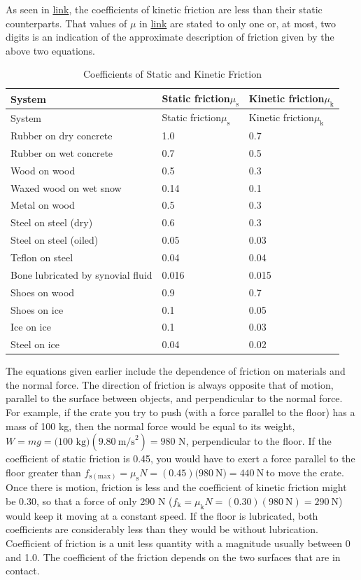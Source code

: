 \documentclass[
]{book}
\begin{document}
As seen in \protect\hyperlink{import-auto-id1165298658126}{link},
the coefficients of kinetic friction are less than their static
counterparts. That values of \(\mu{}\)\emph{} in
\protect\hyperlink{import-auto-id1165298658126}{link} are stated
to only one or, at most, two digits is an indication of the approximate
description of friction given by the above two equations.

\begin{longtable}[]{@{}lll@{}}
\caption{{Coefficients of Static and Kinetic Friction}}\tabularnewline
\toprule
System & Static friction\(\mu_{\text{s}}{}\) & Kinetic friction\(\mu_{\text{k}}{}\)\tabularnewline
\midrule
\endfirsthead
\toprule
System & Static friction\(\mu_{\text{s}}{}\) & Kinetic friction\(\mu_{\text{k}}{}\)\tabularnewline
\midrule
\endhead
Rubber on dry concrete & 1.0 & 0.7\tabularnewline
Rubber on wet concrete & 0.7 & 0.5\tabularnewline
Wood on wood & 0.5 & 0.3\tabularnewline
Waxed wood on wet snow & 0.14 & 0.1\tabularnewline
Metal on wood & 0.5 & 0.3\tabularnewline
Steel on steel (dry) & 0.6 & 0.3\tabularnewline
Steel on steel (oiled) & 0.05 & 0.03\tabularnewline
Teflon on steel & 0.04 & 0.04\tabularnewline
Bone lubricated by synovial fluid & 0.016 & 0.015\tabularnewline
Shoes on wood & 0.9 & 0.7\tabularnewline
Shoes on ice & 0.1 & 0.05\tabularnewline
Ice on ice & 0.1 & 0.03\tabularnewline
Steel on ice & 0.04 & 0.02\tabularnewline
\bottomrule
\end{longtable}

The equations given earlier \textbf{}include
the dependence of friction on materials and the normal force. The
direction of friction is always opposite that of motion, parallel to the
surface between objects, and perpendicular to the normal force. For
example, if the crate you try to push (with a force parallel to the
floor) has a mass of 100 kg, then the normal force would be equal to its
weight,
\({{{W = {mg}} = (}\text{100\ kg})(9\text{.}\text{80}\ \text{m/s}^{2}) = \text{980\ N}}{}\),
perpendicular to the floor. If the coefficient of static friction is
0.45, you would have to exert a force parallel to the floor greater than
\({{f_{\text{s}(\text{max})} = \mu_{\text{s}}}{N =}\left( 0.45 \right){(\text{980}}{\ \text{N}) = \text{440}}\ \text{N}}\ {}\)to
move the crate. Once there is motion, friction is less and the
coefficient of kinetic friction might be 0.30, so that a force of only
290 N
(\({{f_{\text{k}} = \mu_{\text{k}}}{N = \left( {0\text{.}\text{30}} \right)}{\left( {\text{980}\ \text{N}} \right) = \text{290}}\ \text{N}}{}\))
would keep it moving at a constant speed. If the floor is lubricated,
both coefficients are considerably less than they would be without
lubrication. Coefficient of friction is a unit less quantity with a
magnitude usually between 0 and 1.0. The coefficient of the friction
depends on the two surfaces that are in contact.
\end{document}
